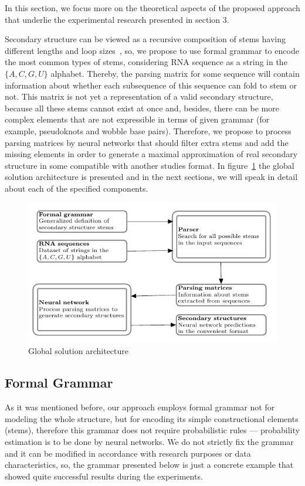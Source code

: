 In this section, we focus more on the theoretical aspects of the proposed approach that underlie the experimental research presented in section 3. 

Secondary structure can be viewed as a recursive composition of stems having different lengths and loop sizes~\cite{MQbioinformatics19}, so, we propose to use formal grammar to encode the most common types of stems, considering RNA sequence as a string in the $\{A, C, G, U\}$ alphabet. Thereby, the parsing matrix for some sequence will contain information about whether each subsequence of this sequence can fold to stem or not. This matrix is not yet a representation of a valid secondary structure, because all these stems cannot exist at once and, besides, there can be more complex elements that are not expressible in terms of given grammar (for example, pseudoknots and wobble base pairs). Therefore, we propose to process parsing matrices by neural networks that should filter extra stems and add the missing elements in order to generate a maximal approximation of real secondary structure in some compatible with another studies format. In figure~\ref{arch} the global solution architecture is presented and in the next sections, we will speak in detail about each of the specified components.

\begin{figure}[h]
\centering
\includegraphics[width=\textwidth]{pics/arch.pdf}
\caption{Global solution architecture}
\label{arch}
\end{figure}

\subsection{Formal Grammar}
As it was mentioned before, our approach employs formal grammar not for modeling the whole structure, but for encoding its simple constructional elements (stems), therefore this grammar does not require probabilistic rules --- probability estimation is to be done by neural networks. We do not strictly fix the grammar and it can be modified in accordance with research purposes or data characteristics, so, the grammar presented below is just a concrete example that showed quite successful results during the experiments.

